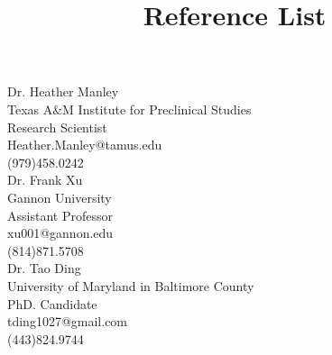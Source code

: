 \documentclass[12pt]{article}
\title{Reference List}
\begin{document}
Dr. Heather Manley\\ 
\indent Texas A\&M Institute for Preclinical Studies\\
\indent Research Scientist\\
\indent Heather.Manley@tamus.edu\\
\indent (979)458.0242\\

Dr. Frank Xu\\
\indent Gannon University\\
\indent Assistant Professor\\
\indent xu001@gannon.edu\\
\indent (814)871.5708\\

Dr. Tao Ding\\
\indent University of Maryland in Baltimore County\\
\indent PhD. Candidate\\
\indent tding1027@gmail.com\\
\indent (443)824.9744
\end{document}
